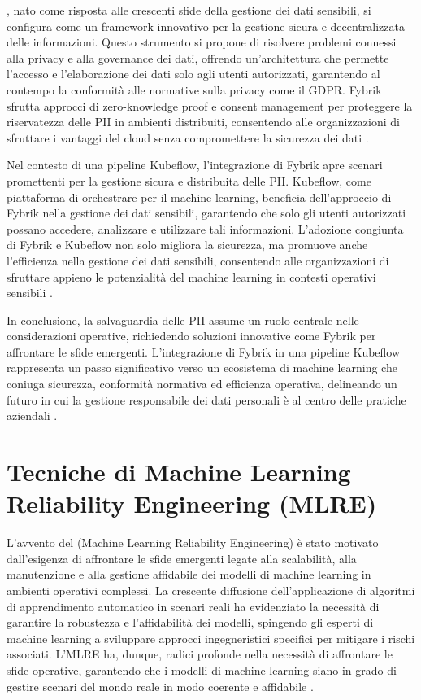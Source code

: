 , nato come risposta alle crescenti sfide della gestione dei dati sensibili, si configura come un framework innovativo per la gestione sicura e decentralizzata delle informazioni. Questo strumento si propone di risolvere problemi connessi alla privacy e alla governance dei dati, offrendo un'architettura che permette l'accesso e l'elaborazione dei dati solo agli utenti autorizzati, garantendo al contempo la conformità alle normative sulla privacy come il GDPR. Fybrik sfrutta approcci di zero-knowledge proof e consent management per proteggere la riservatezza delle PII in ambienti distribuiti, consentendo alle organizzazioni di sfruttare i vantaggi del cloud senza compromettere la sicurezza dei dati \cite{fybrik_origin}.

Nel contesto di una pipeline Kubeflow, l'integrazione di Fybrik apre scenari promettenti per la gestione sicura e distribuita delle PII. Kubeflow, come piattaforma di orchestrare per il machine learning, beneficia dell'approccio di Fybrik nella gestione dei dati sensibili, garantendo che solo gli utenti autorizzati possano accedere, analizzare e utilizzare tali informazioni. L'adozione congiunta di Fybrik e Kubeflow non solo migliora la sicurezza, ma promuove anche l'efficienza nella gestione dei dati sensibili, consentendo alle organizzazioni di sfruttare appieno le potenzialità del machine learning in contesti operativi sensibili \cite{kubeflow_fybrik_integration}.

In conclusione, la salvaguardia delle PII assume un ruolo centrale nelle considerazioni operative, richiedendo soluzioni innovative come Fybrik per affrontare le sfide emergenti. L'integrazione di Fybrik in una pipeline Kubeflow rappresenta un passo significativo verso un ecosistema di machine learning che coniuga sicurezza, conformità normativa ed efficienza operativa, delineando un futuro in cui la gestione responsabile dei dati personali è al centro delle pratiche aziendali \cite{pii_security_ml}.

\section{Tecniche di Machine Learning Reliability Engineering (MLRE)}

L'avvento del  (Machine Learning Reliability Engineering) è stato motivato dall'esigenza di affrontare le sfide emergenti legate alla scalabilità, alla manutenzione e alla gestione affidabile dei modelli di machine learning in ambienti operativi complessi. La crescente diffusione dell'applicazione di algoritmi di apprendimento automatico in scenari reali ha evidenziato la necessità di garantire la robustezza e l'affidabilità dei modelli, spingendo gli esperti di machine learning a sviluppare approcci ingegneristici specifici per mitigare i rischi associati. L'MLRE ha, dunque, radici profonde nella necessità di affrontare le sfide operative, garantendo che i modelli di machine learning siano in grado di gestire scenari del mondo reale in modo coerente e affidabile \cite{MLRE_origin}.

